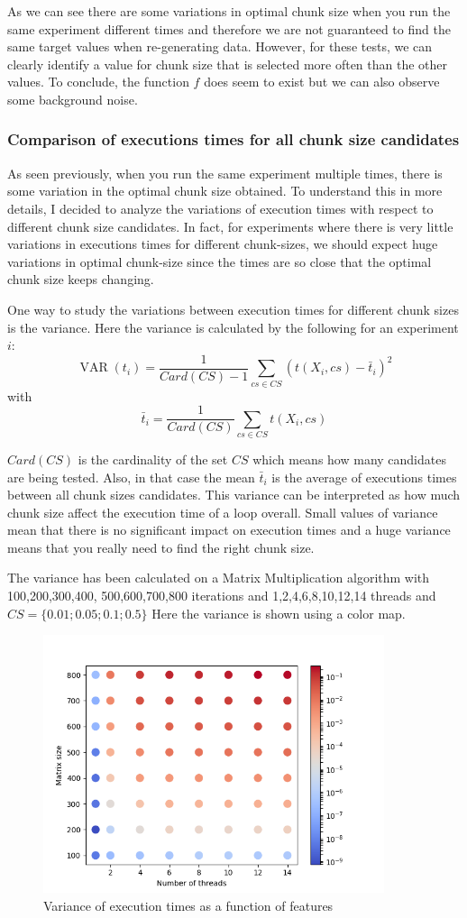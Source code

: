 \documentclass[12pt]{article}
\begin{document}
As we can see there are some variations in optimal chunk size when you run the same experiment different times and therefore we are not guaranteed to find the same target values when re-generating data. However, for these tests, we can clearly identify a value for chunk size that is selected more often than the other values. To conclude, the function $f$ does seem to exist but we can also observe some background noise.

\subsubsection{Comparison of executions times for all chunk size candidates}
As seen previously, when you run the same experiment multiple times, there is some variation in the optimal chunk size obtained. To understand this in more details, I decided to analyze the variations of execution times with respect to different chunk size candidates.
 In fact, for experiments where there is very little variations in executions times for different chunk-sizes, we should expect huge variations in optimal chunk-size since the times are so close that the optimal chunk size keeps changing.

One way to study the variations between execution times for different chunk sizes is the variance. Here the variance is calculated by the following for an experiment $i$:
$$\operatorname{VAR}(t_i)=\frac{1}{Card(CS)-1}\sum_{cs \in CS}(t(X_i,cs)-\bar{t}_i)^2$$
with 
$$\bar{t}_i=\frac{1}{Card(CS)}\sum_{cs \in CS}t(X_i,cs)$$

 $Card(CS)$ is the cardinality of the set $CS$ which means how many candidates are being tested. Also, in that case the mean $\bar{t}_i$ is the average of executions times between all chunk sizes candidates. This variance can be interpreted as how much chunk size affect the execution time of a loop overall. Small values of variance mean that there is no significant impact on execution times and a huge variance means that you really need to find the right chunk size.

The variance has been calculated on a Matrix Multiplication algorithm with 100,200,300,400, 500,600,700,800 iterations and 1,2,4,6,8,10,12,14 threads and $CS=\{0.01;0.05;0.1;0.5\}$
Here the variance is shown using a color map.

\begin{figure}[H]
	\centering
	\includegraphics[width=100mm]{var_chunk_sizes.png}
	\caption{Variance of execution times as a function of features}
\end{figure}
\end{document}
